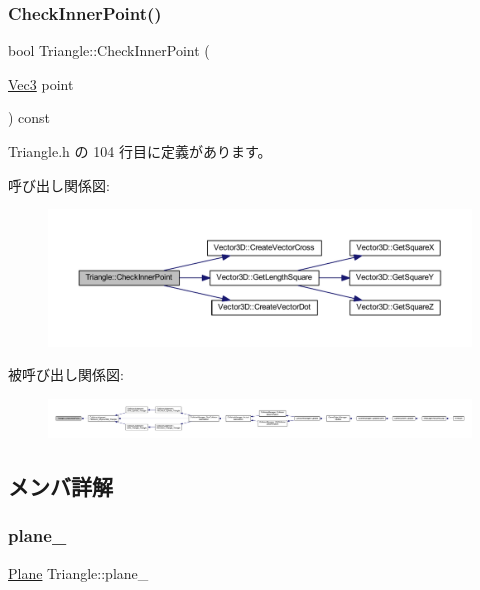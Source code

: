 \subsubsection{\texorpdfstring{Check\+Inner\+Point()}{CheckInnerPoint()}}
{\footnotesize\ttfamily bool Triangle\+::\+Check\+Inner\+Point (\begin{DoxyParamCaption}\item[{\mbox{\hyperlink{_vector3_d_8h_ab16f59e4393f29a01ec8b9bbbabbe65d}{Vec3}}}]{point }\end{DoxyParamCaption}) const\hspace{0.3cm}{\ttfamily [inline]}}



 Triangle.\+h の 104 行目に定義があります。

呼び出し関係図\+:\nopagebreak
\begin{figure}[H]
\begin{center}
\leavevmode
\includegraphics[width=350pt]{class_triangle_ac5d6a4c5f2bfda5cdc56c89a294fb46e_cgraph}
\end{center}
\end{figure}
被呼び出し関係図\+:
\nopagebreak
\begin{figure}[H]
\begin{center}
\leavevmode
\includegraphics[width=350pt]{class_triangle_ac5d6a4c5f2bfda5cdc56c89a294fb46e_icgraph}
\end{center}
\end{figure}


\subsection{メンバ詳解}
\mbox{\label{class_triangle_a93586199c2c173771f2e167f477eaa70}} 
\subsubsection{\texorpdfstring{plane\+\_\+}{plane\_}}
{\footnotesize\ttfamily \mbox{\hyperlink{class_plane}{Plane}} Triangle\+::plane\+\_\+}



